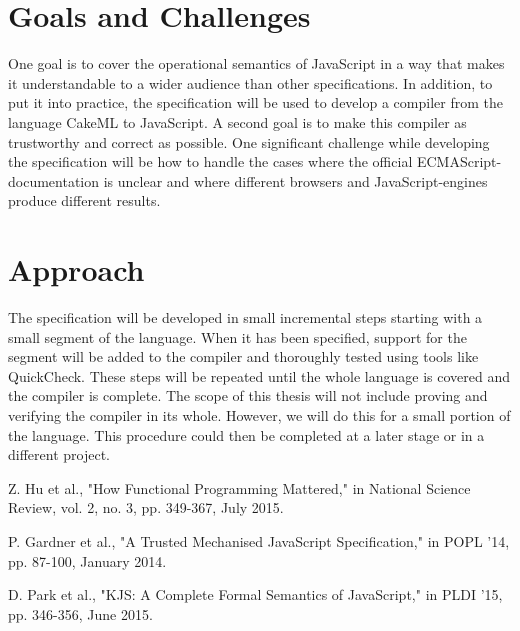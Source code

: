 \documentclass [11pt]{article}
\begin{document}
\section{Goals and Challenges}
One goal is to cover the operational semantics of JavaScript in a way that makes it understandable to a wider audience than other specifications. In addition, to put it into practice, the specification will be used to develop a compiler from the language CakeML to JavaScript. A second goal is to make this compiler as trustworthy and correct as possible. One significant challenge while developing the specification will be how to handle the cases where the official ECMAScript-documentation is unclear and where different browsers and JavaScript-engines produce different results.
 
\section{Approach}
The specification will be developed in small incremental steps starting with a small segment of the language. When it has been specified, support for the segment will be added to the compiler and thoroughly tested using tools like QuickCheck. These steps will be repeated until the whole language is covered and the compiler is complete. The scope of this thesis will not include proving and verifying the compiler in its whole. However, we will do this for a small portion of the language. This procedure could then be completed at a later stage or in a different project.
\nocite{*}
\begin{thebibliography}{1}

Z. Hu et al., "How Functional Programming Mattered," in National Science Review, vol. 2, no. 3, pp. 349-367, July 2015.	

P. Gardner et al., "A Trusted Mechanised JavaScript Specification," in POPL ’14, pp. 87-100, January 2014.	

D. Park et al., "KJS: A Complete Formal Semantics of JavaScript," in PLDI '15, pp. 346-356, June 2015.	

\end{thebibliography}
\end{document}
